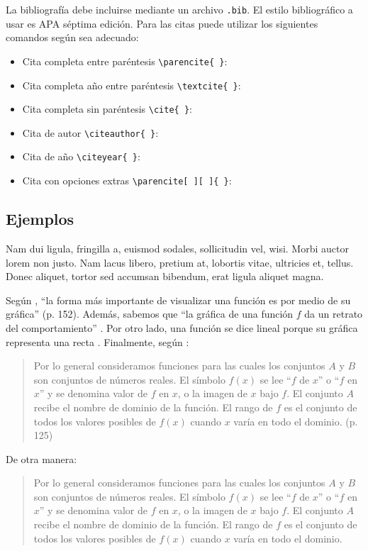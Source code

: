 \documentclass[11pt]{article}
\begin{document}
La bibliografía debe incluirse mediante un archivo \texttt{.bib}. El estilo bibliográfico a usar es APA séptima edición. Para las citas puede utilizar los siguientes comandos según sea adecuado:
\begin{itemize}
\item 
    Cita completa entre paréntesis \verb"\parencite{ }": \parencite{stewartpre}
\item
    Cita completa año entre paréntesis \verb"\textcite{ }": \textcite{stewartpre}
\item 
    Cita completa sin paréntesis \verb"\cite{ }": \cite{stewartpre}
\item
    Cita de autor \verb"\citeauthor{ }": \citeauthor{stewartpre}
\item
    Cita de año \verb"\citeyear{ }": \citeyear{stewartpre}
\item 
    Cita con opciones extras \verb"\parencite[ ][ ]{ }": \parencite[ver][p. 66]{stewartpre}
\end{itemize}

\subsection{Ejemplos}

Nam dui ligula, fringilla a, euismod sodales, sollicitudin vel, wisi. Morbi auctor lorem non justo. Nam lacus libero, pretium at, lobortis vitae, ultricies et, tellus. Donec aliquet, tortor sed accumsan bibendum, erat ligula aliquet magna.

Según \textcite{stewartpre}, ``la forma más importante de visualizar una función es por medio de su gráfica'' (p. 152). Además, sabemos que ``la gráfica de una función $f$ da un retrato del comportamiento'' \parencite[p. 153]{stewartpre}. Por otro lado, una función se dice lineal porque su gráfica representa una recta \parencite{stewartpre}. Finalmente, según \textcite{stewartpre}:
\begin{quote}
    Por lo general consideramos funciones para las cuales los conjuntos $A$ y $B$ son conjuntos de números reales. El símbolo $f(x)$ se lee “$f$ de $x$” o “$f$ en $x$” y se denomina valor de $f$ en $x$, o la imagen de $x$ bajo $f$. El conjunto $A$ recibe el nombre de dominio de la función. El rango de $f$ es el conjunto de todos los valores posibles de $f(x)$ cuando $x$ varía en todo el dominio. (p. 125)
\end{quote}

De otra manera:
\begin{quote}
    Por lo general consideramos funciones para las cuales los conjuntos $A$ y $B$ son conjuntos de números reales. El símbolo $f(x)$ se lee “$f$ de $x$” o “$f$ en $x$” y se denomina valor de $f$ en $x$, o la imagen de $x$ bajo $f$. El conjunto $A$ recibe el nombre de dominio de la función. El rango de $f$ es el conjunto de todos los valores posibles de $f(x)$ cuando $x$ varía en todo el dominio. \parencite[p. 125]{stewartpre}
\end{quote}

\nocite{*}
\printbibliography
\end{document}
